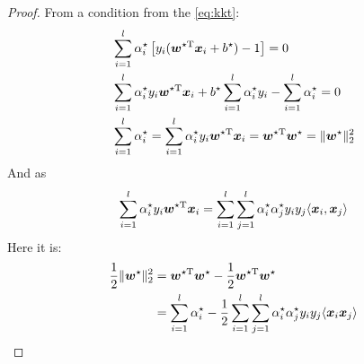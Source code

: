 \documentclass[a4paper]{article}
\begin{document}
{\begin{enumerate}
\begin{enumerate}
       \begin{proof}
            From a condition from the \eqref{eq:kkt}:
            \begin{equation*}
            \begin{aligned}
                 &\sum_{i=1}^{l}\alpha_i^{\star}\left[y_i(\bm{w}^{\star\mathrm{T}}\bm{x}_i+b^{\star})-1\right] = 0 \\
                 &\sum_{i=1}^{l}\alpha_i^{\star}y_i\bm{w}^{\star\mathrm{T}}\bm{x}_i + 
                    b^{\star}\sum_{i=1}^{l}\alpha_i^{\star}y_i - \sum_{i=1}^{l}\alpha_i^{\star} = 0  \\
                 &\sum_{i=1}^{l}\alpha_i^{\star} = \sum_{i=1}^{l}\alpha_i^{\star}y_i\bm{w}^{\star\mathrm{T}}\bm{x}_i 
                    = \bm{w}^{\star\mathrm{T}}\bm{w}^{\star} = \|\bm{w}^{\star}\|_2^2
            \end{aligned}
            \end{equation*}
            And as \begin{equation*}
                \sum_{i=1}^{l}\alpha_i^{\star}y_i\bm{w}^{\star\mathrm{T}}\bm{x}_i = 
                \sum_{i=1}^{l} \sum_{j=1}^{l} \alpha_i^{\star} \alpha_j^{\star} 
                y_i y_j \langle \bm{x}_i,\bm{x}_j \rangle
                \end{equation*}
            Here it is:
            \begin{equation*}
            \begin{aligned}
                \frac12 \|\bm{w}^{\star} \|_2^2 &= \bm{w}^{\star\mathrm{T}}\bm{w}^{\star} - 
                    \frac12 \bm{w}^{\star\mathrm{T}}\bm{w}^{\star}\\
                    &= \sum_{i=1}^{l}\alpha_i^{\star} - 
                    \frac12 \sum_{i=1}^{l}\sum_{j=1}^{l}  \alpha_i^{\star}\alpha_j^{\star} 
                        y_i y_j \langle \bm{x}_i \bm{x}_j \rangle 
            \end{aligned}
            \end{equation*}
        \end{proof}
    \end{enumerate}


\end{enumerate}}
\end{document}
